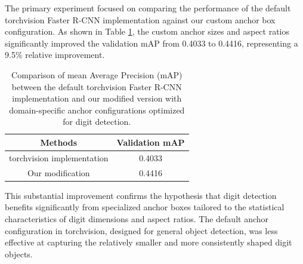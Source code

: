 \documentclass[twocolumn,a4paper]{article}
\begin{document}
The primary experiment focused on comparing the performance of the default torchvision Faster R-CNN implementation against our custom anchor box configuration. As shown in Table \ref{tab:anchor-comparison}, the custom anchor sizes and aspect ratios significantly improved the validation mAP from 0.4033 to 0.4416, representing a 9.5\% relative improvement.

\begin{table}[H]
\centering
\begin{tabular}{@{}cc@{}}
\toprule
Methods                    & Validation mAP \\ \midrule
torchvision implementation & 0.4033         \\
Our modification           & 0.4416         \\ \bottomrule
\end{tabular}
\caption{Comparison of mean Average Precision (mAP) between the default torchvision Faster R-CNN implementation and our modified version with domain-specific anchor configurations optimized for digit detection.}
\label{tab:anchor-comparison}
\end{table}

This substantial improvement confirms the hypothesis that digit detection benefits significantly from specialized anchor boxes tailored to the statistical characteristics of digit dimensions and aspect ratios. The default anchor configuration in torchvision, designed for general object detection, was less effective at capturing the relatively smaller and more consistently shaped digit objects.
\end{document}
